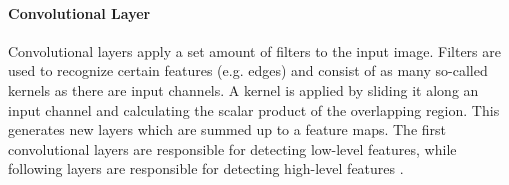 \paragraph{Convolutional Layer}
Convolutional layers apply a set amount of filters to the input image.
Filters are used to recognize certain features (e.g. edges) and consist of as many so-called kernels as there are input channels.
A kernel is applied by sliding it along an input channel and calculating the scalar product of the overlapping region.
This generates new layers which are summed up to a feature maps.
The first convolutional layers are responsible for detecting low-level features, while following layers are responsible for detecting high-level features \cite[p.~327--330]{deeplearningbook}.

